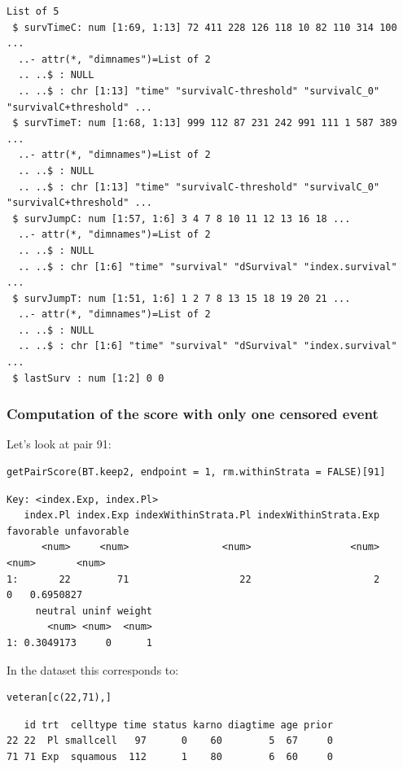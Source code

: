 \documentclass[12pt]{article}
\begin{document}
\begin{verbatim}
List of 5
 $ survTimeC: num [1:69, 1:13] 72 411 228 126 118 10 82 110 314 100 ...
  ..- attr(*, "dimnames")=List of 2
  .. ..$ : NULL
  .. ..$ : chr [1:13] "time" "survivalC-threshold" "survivalC_0" "survivalC+threshold" ...
 $ survTimeT: num [1:68, 1:13] 999 112 87 231 242 991 111 1 587 389 ...
  ..- attr(*, "dimnames")=List of 2
  .. ..$ : NULL
  .. ..$ : chr [1:13] "time" "survivalC-threshold" "survivalC_0" "survivalC+threshold" ...
 $ survJumpC: num [1:57, 1:6] 3 4 7 8 10 11 12 13 16 18 ...
  ..- attr(*, "dimnames")=List of 2
  .. ..$ : NULL
  .. ..$ : chr [1:6] "time" "survival" "dSurvival" "index.survival" ...
 $ survJumpT: num [1:51, 1:6] 1 2 7 8 13 15 18 19 20 21 ...
  ..- attr(*, "dimnames")=List of 2
  .. ..$ : NULL
  .. ..$ : chr [1:6] "time" "survival" "dSurvival" "index.survival" ...
 $ lastSurv : num [1:2] 0 0
\end{verbatim}

\subsubsection{Computation of the score with only one censored event}
\label{sec:org5aabc02}

Let's look at pair 91:
\lstset{language=r,label= ,caption= ,captionpos=b,numbers=none}
\begin{lstlisting}
getPairScore(BT.keep2, endpoint = 1, rm.withinStrata = FALSE)[91]
\end{lstlisting}

\begin{verbatim}
Key: <index.Exp, index.Pl>
   index.Pl index.Exp indexWithinStrata.Pl indexWithinStrata.Exp favorable unfavorable
      <num>     <num>                <num>                 <num>     <num>       <num>
1:       22        71                   22                     2         0   0.6950827
     neutral uninf weight
       <num> <num>  <num>
1: 0.3049173     0      1
\end{verbatim}


In the dataset this corresponds to:
\lstset{language=r,label= ,caption= ,captionpos=b,numbers=none}
\begin{lstlisting}
veteran[c(22,71),]
\end{lstlisting}

\begin{verbatim}
   id trt  celltype time status karno diagtime age prior
22 22  Pl smallcell   97      0    60        5  67     0
71 71 Exp  squamous  112      1    80        6  60     0
\end{verbatim}
\end{document}
